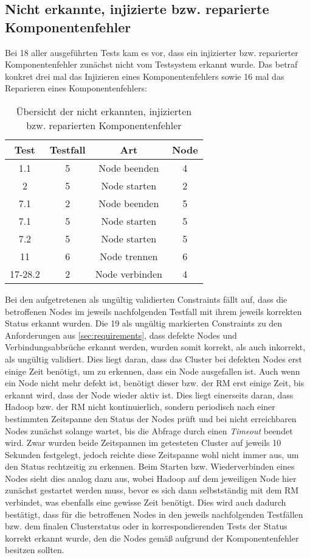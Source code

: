 \subsection{Nicht erkannte, injizierte bzw. reparierte Komponentenfehler}
\label{subsec:notDetectedFaults}

Bei 18 aller ausgeführten Tests kam es vor, dass ein injizierter bzw. reparierter Komponentenfehler zunächst nicht vom Testsystem erkannt wurde.
Das betraf konkret drei mal das Injizieren eines Komponentenfehlers sowie 16 mal das Reparieren eines Komponentenfehlers:

\begin{table}[h]
    \begin{tabular}{c|ccc}
    	 Test   & Testfall &      Art       & Node \\ \hline
    	  1.1   &    5     &  Node beenden  &  4   \\
    	   2    &    5     &  Node starten  &  2   \\
    	  7.1   &    2     &  Node beenden  &  5   \\
    	  7.1   &    5     &  Node starten  &  5   \\
    	  7.2   &    5     &  Node starten  &  5   \\
    	  11    &    6     &  Node trennen  &  6   \\
    	17-28.2 &    2     & Node verbinden &  4
    \end{tabular} 
    \caption{Übersicht der nicht erkannten, injizierten bzw. reparierten Komponentenfehler}
    \label{tab:notDetectedFaults}
\end{table}

Bei den aufgetretenen als ungültig validierten Constraints fällt auf, dass die betroffenen Nodes im jeweils nachfolgenden Testfall mit ihrem jeweils korrekten Status erkannt wurden.
Die 19 als ungültig markierten Constraints zu den Anforderungen aus \autoref{sec:requirements}, dass defekte Nodes und Verbindungsabbrüche erkannt werden, wurden somit korrekt, als auch inkorrekt, als ungültig validiert.
Dies liegt daran, dass das Cluster bei defekten Nodes erst einige Zeit benötigt, um zu erkennen, dass ein Node ausgefallen ist.
Auch wenn ein Node nicht mehr defekt ist, benötigt dieser bzw. der \ac{RM} erst einige Zeit, bis erkannt wird, dass der Node wieder aktiv ist.
Dies liegt einerseits daran, dass Hadoop bzw. der \ac{RM} nicht kontinuierlich, sondern periodisch nach einer bestimmten Zeitspanne den Status der Nodes prüft und bei nicht erreichbaren Nodes zunächst solange wartet, bis die Abfrage durch einen \emph{Timeout} beendet wird.
Zwar wurden beide Zeitspannen im getesteten Cluster auf jeweils 10 Sekunden festgelegt, jedoch reichte diese Zeitspanne wohl nicht immer aus, um den Status rechtzeitig zu erkennen.
Beim Starten bzw. Wiederverbinden eines Nodes sieht dies analog dazu aus, wobei Hadoop auf dem jeweiligen Node hier zunächst gestartet werden muss, bevor es sich dann selbstständig mit dem \ac{RM} verbindet, was ebenfalls eine gewisse Zeit benötigt.
Dies wird auch dadurch bestätigt, dass für die betroffenen Nodes in den jeweils nachfolgenden Testfällen bzw. dem finalen Clusterstatus oder in korrespondierenden Tests der Status korrekt erkannt wurde, den die Nodes gemäß aufgrund der Komponentenfehler besitzen sollten.

